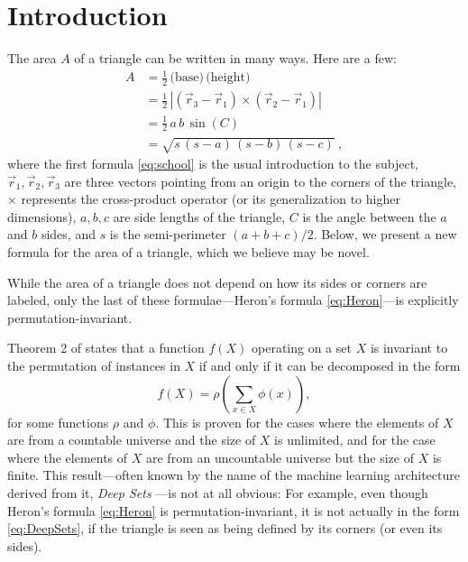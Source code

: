 \documentclass[12pt]{article}
\begin{document}
\section{Introduction}
The area $A$ of a triangle can be written in many ways.
Here are a few:
\begin{align}
A &= \frac{1}{2}\,\text{(base)}\,\text{(height)} \label{eq:school} \\
  &= \frac{1}{2}\,|(\vec{r}_3 - \vec{r}_1) \times (\vec{r}_2 - \vec{r}_1)| \label{eq:cross} \\
  &= \frac{1}{2}\,a\,b\,\sin(C) \label{eq:sine} \\
  &= \sqrt{s\,(s-a)\,(s-b)\,(s-c)} \label{eq:Heron} ~,
\end{align}
where the first formula \eqref{eq:school} is the usual introduction to the subject,
$\vec{r}_1, \vec{r}_2, \vec{r}_3$ are three vectors pointing from an origin to the corners of the triangle,
$\times$ represents the cross-product operator (or its generalization to higher dimensions),
$a, b, c$ are side lengths of the triangle,
$C$ is the angle between the $a$ and $b$ sides,
and $s$ is the semi-perimeter $(a + b + c)/2$.
Below, we present a new formula for the area of a triangle, which we believe may be novel.

While the area of a triangle does not depend on how its sides or corners are labeled,
only the last of these formulae---Heron's formula \eqref{eq:Heron}---is explicitly permutation-invariant.

Theorem 2 of \citet{zaheer+17-Deep-Sets} states that a function $f(X)$ operating on a set $X$ is invariant to the permutation of instances in $X$ if and only if it can be decomposed in the form
\begin{equation}
    \textstyle f(X) = \rho \left( \sum_{x \in X} \phi(x) \right), \label{eq:DeepSets}
\end{equation}
for some functions $\rho$ and $\phi$.
This is proven for the cases where the elements of $X$ are from a countable universe and the size of $X$ is unlimited, and for the case where the elements of $X$ are from an uncountable universe but the size of $X$ is finite.
This result---often known by the name of the machine learning architecture derived from it, \emph{Deep Sets} \citep{zaheer+17-Deep-Sets}---is not at all obvious:
For example, even though Heron's formula \eqref{eq:Heron} is permutation-invariant, it is not actually in the form \eqref{eq:DeepSets}, if the triangle is seen as being defined by its corners (or even its sides).
\end{document}
